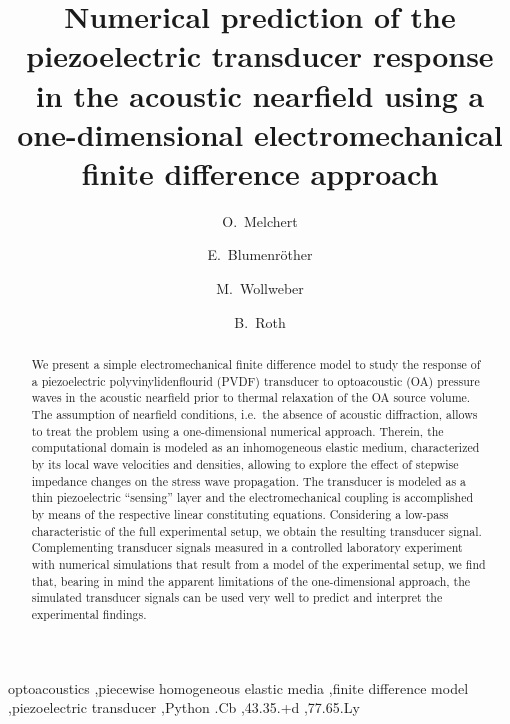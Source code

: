 \documentclass[5p,times,twocolumn]{elsarticle}
\begin{document}
\begin{frontmatter}


\title{Numerical prediction of the piezoelectric transducer response in the
acoustic nearfield using a one-dimensional electromechanical finite difference
approach}

\author{O.\ Melchert} 
%
\author{E.\, Blumenr\"other}
%
\author{M.\, Wollweber}
%
\author{B.\, Roth}
%
\address{Hannover Centre for Optical Technologies (HOT), 
Leibniz Universit\"at Hannover, Nienburger Str.\,17, D-30167 Hannover, Germany}
%

\begin{abstract}
We present a simple electromechanical finite difference model to study the
response of a piezoelectric polyvinylidenflourid (PVDF) transducer to
optoacoustic (OA) pressure waves in the acoustic nearfield prior to thermal
relaxation of the OA source volume. The assumption of nearfield conditions,
i.e.\ the absence of acoustic diffraction, allows to treat the problem using a
one-dimensional numerical approach.  Therein, the computational domain is
modeled as an inhomogeneous elastic medium, characterized by its local wave
velocities and densities, allowing to explore the effect of stepwise impedance
changes on the stress wave propagation.  The transducer is modeled as a thin
piezoelectric ``sensing'' layer and the electromechanical coupling is
accomplished by means of the respective linear constituting equations.
Considering a low-pass characteristic of the full experimental setup, we obtain
the resulting transducer signal.  Complementing transducer signals measured in
a controlled laboratory experiment with numerical simulations that result from
a model of the experimental setup, we find that, bearing in mind the apparent
limitations of the one-dimensional approach, the simulated transducer signals
can be used very well to predict and interpret the experimental findings.
\end{abstract}

\begin{keyword}
optoacoustics \sep piecewise homogeneous elastic media \sep finite difference
model \sep piezoelectric transducer \sep Python
.Cb \sep 43.35.+d \sep 77.65.Ly 
\end{keyword}

\end{frontmatter}
\end{document}
